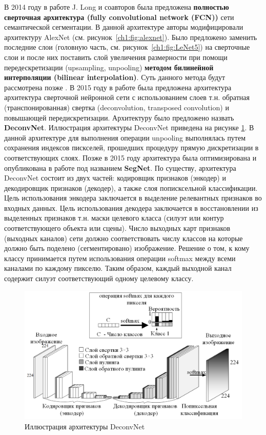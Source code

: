 \documentclass[12pt]{article}
\begin{document}
\begin{sloppypar}
В 2014 году в работе J. Long и соавторов \cite{long2015fully} была предложена \textbf{полностью сверточная архитектура (fully convolutional network (FCN))} сети семантической сегментации. В данной архитектуре авторы модифицировали архитектуру AlexNet (см. рисунок~\ref{ch1:fig:alexnet}). Было предложено  заменить последние слои (головную часть, см. рисунок~\ref{ch1:fig:LeNet5}) на сверточные слои и после них поставить слой увеличения размерности при помощи передескретизации (upsampling, unpooling) \textbf{методом билинейной интерполяции (bilinear interpolation)}. Суть данного метода будут рассмотрена позже \cite{long2015fully}. В 2015 году в работе \cite{noh2015learning} была предложена архитектура архитектура сверточной нейронной сети с использованием слоев т.н. обратная (транспонированная) свертка (deconvolution, transposed convolution) и повышающей передискретизации. Архитектуру было предложено назвать \textbf{DeconvNet}. Иллюстрация архитектуры DeconvNet приведена на рисунке \ref{ch1:fig:DeconvNet}. В данной архитектуре для выполнения операции unpooling выполнялась путем сохранения индексов пискселей, прошедших процедуру прямую дискретизации в соответствующих слоях.  Позже в 2015 году архитектура была оптимизирована и опубликована в работе \cite{badrinarayanan2015segnet} под названием \textbf{SegNet}. По существу, архитектура DeconvNet состоит из двух частей: кодировщик признаков (энкодер) и декодировщик признаков (декодер), а также слоя пописксельной классификации. Цель использования энкодера заключается в выделение релевантных признаков во входных данных. Цель использования декодера заключается в восстановлении из выделенных признаков т.н. маски целевого класса (силуэт или контур соответствующего объекта или сцены). Число выходных карт признаков (выходных каналов) сети должно соответствовать числу классов на которые должно быть поделено (сегментировано) изображение. Решение о том, к кому классу принимается путем использования операции softmax между всеми каналами по каждому пикселю. Таким образом, каждый выходной канал содержит силуэт соответствующий одному целевому классу.

     \begin{figure}[!h]
    	\begin{center}
    		\includegraphics[width=0.99\linewidth]{./figuresch1/DeconvNet_v3.png}
    		\caption{Иллюстрация  архитектуры  DeconvNet}	
    		\label{ch1:fig:DeconvNet}
    	\end{center}
    \end{figure}


\end{sloppypar}
\end{document}
